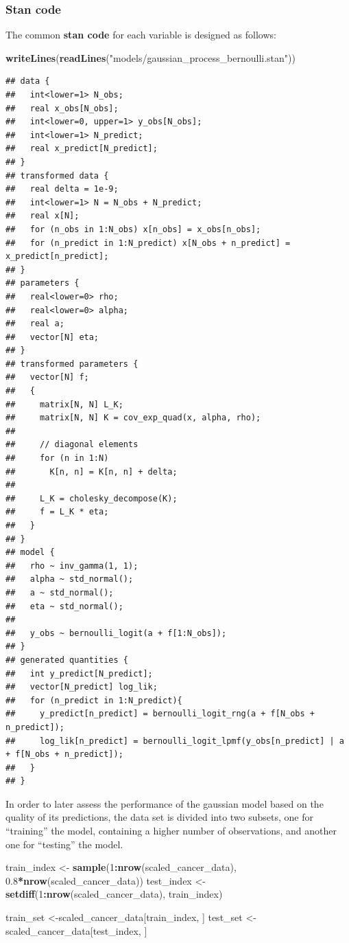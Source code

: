 \documentclass[
]{article}
\newenvironment{Shaded}{\begin{snugshade}}{\end{snugshade}}
\newcommand{\DecValTok}[1]{\textcolor[rgb]{0.00,0.00,0.81}{#1}}
\newcommand{\FloatTok}[1]{\textcolor[rgb]{0.00,0.00,0.81}{#1}}
\newcommand{\KeywordTok}[1]{\textcolor[rgb]{0.13,0.29,0.53}{\textbf{#1}}}
\newcommand{\NormalTok}[1]{#1}
\newcommand{\OperatorTok}[1]{\textcolor[rgb]{0.81,0.36,0.00}{\textbf{#1}}}
\newcommand{\StringTok}[1]{\textcolor[rgb]{0.31,0.60,0.02}{#1}}
\begin{document}
\hypertarget{stan-code-2}{%
\subsubsection{Stan code}\label{stan-code-2}}

The common \textbf{stan code} for each variable is designed as follows:

\begin{Shaded}
\begin{Highlighting}[]
\KeywordTok{writeLines}\NormalTok{(}\KeywordTok{readLines}\NormalTok{(}\StringTok{"models/gaussian_process_bernoulli.stan"}\NormalTok{))}
\end{Highlighting}
\end{Shaded}

\begin{verbatim}
## data {
##   int<lower=1> N_obs;
##   real x_obs[N_obs];
##   int<lower=0, upper=1> y_obs[N_obs];
##   int<lower=1> N_predict;
##   real x_predict[N_predict];
## }
## transformed data {
##   real delta = 1e-9;
##   int<lower=1> N = N_obs + N_predict;
##   real x[N];
##   for (n_obs in 1:N_obs) x[n_obs] = x_obs[n_obs];
##   for (n_predict in 1:N_predict) x[N_obs + n_predict] = x_predict[n_predict];
## }
## parameters {
##   real<lower=0> rho;
##   real<lower=0> alpha;
##   real a;
##   vector[N] eta;
## }
## transformed parameters {
##   vector[N] f;
##   {
##     matrix[N, N] L_K;
##     matrix[N, N] K = cov_exp_quad(x, alpha, rho);
## 
##     // diagonal elements
##     for (n in 1:N)
##       K[n, n] = K[n, n] + delta;
## 
##     L_K = cholesky_decompose(K);
##     f = L_K * eta;
##   }
## }
## model {
##   rho ~ inv_gamma(1, 1);
##   alpha ~ std_normal();
##   a ~ std_normal();
##   eta ~ std_normal();
## 
##   y_obs ~ bernoulli_logit(a + f[1:N_obs]);
## }
## generated quantities {
##   int y_predict[N_predict];
##   vector[N_predict] log_lik;
##   for (n_predict in 1:N_predict){
##     y_predict[n_predict] = bernoulli_logit_rng(a + f[N_obs + n_predict]);
##     log_lik[n_predict] = bernoulli_logit_lpmf(y_obs[n_predict] | a + f[N_obs + n_predict]);
##   }
## }
\end{verbatim}

In order to later assess the performance of the gaussian model based on
the quality of its predictions, the data set is divided into two
subsets, one for ``training'' the model, containing a higher number of
observations, and another one for ``testing'' the model.

\begin{Shaded}
\begin{Highlighting}[]
\NormalTok{train_index <-}\StringTok{ }\KeywordTok{sample}\NormalTok{(}\DecValTok{1}\OperatorTok{:}\KeywordTok{nrow}\NormalTok{(scaled_cancer_data), }\FloatTok{0.8}\OperatorTok{*}\KeywordTok{nrow}\NormalTok{(scaled_cancer_data))}
\NormalTok{test_index <-}\StringTok{ }\KeywordTok{setdiff}\NormalTok{(}\DecValTok{1}\OperatorTok{:}\KeywordTok{nrow}\NormalTok{(scaled_cancer_data), train_index)}

\NormalTok{train_set <-scaled_cancer_data[train_index, ]}
\NormalTok{test_set <-}\StringTok{ }\NormalTok{scaled_cancer_data[test_index, ]}
\end{Highlighting}
\end{Shaded}
\end{document}

